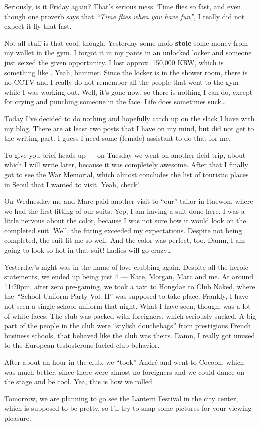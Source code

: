 \begin{post}
	\begin{content}
Seriously, is it Friday again? That's serious mess. Time flies so fast, and even though one proverb says that \textit{``Time flies when you have fun''}, I really did not expect it fly that fast.

Not all stuff is that cool, though. Yesterday some mofo \textbf{stole} some money from my wallet in the gym. I forgot it in my pants in an unlocked locker and someone just seized the given opportunity. I lost approx. 150,000 KRW, which is something like . Yeah, bummer. Since the locker is in the shower room, there is no CCTV and I really do not remember all the people that went to the gym while I was working out. Well, it's gone now, so there is nothing I can do, except for crying and punching someone in the face. Life does sometimes suck\ldots

Today I've decided to do nothing and hopefully catch up on the slack I have with my blog. There are at least two posts that I have on my mind, but did not get to the writing part. I guess I need some (female) assistant to do that for me.

To give you brief heads up --- on Tuesday we went on another field trip, about which I will write later, because it was completely awesome. After that I finally got to see the War Memorial, which almost concludes the list of touristic places in Seoul that I wanted to visit. Yeah, check!

On Wednesday me and Marc paid another visit to ``our'' tailor in Itaewon, where we had the first fitting of our suits. Yep, I am having a suit done here. I was a little nervous about the color, because I was not sure how it would look on the completed suit. Well, the fitting exceeded my expectations. Despite not being completed, the suit fit me so well. And the color was perfect, too. Damn, I am going to look so hot in that suit! Ladies will go crazy\ldots

Yesterday's night was in the name of \sout{love} clubbing again. Despite all the heroic statements, we ended up being just 4 --- Kate, Morgan, Marc and me. At around 11:20pm, after zero pre-gaming, we took a taxi to Hongdae to Club Naked, where the ``School Uniform Party Vol. II'' was supposed to take place. Frankly, I have not seen a single school uniform that night. What I have seen, though, was a lot of white faces. The club was packed with foreigners, which seriously sucked. A big part of the people in the club were ``stylish douchebags'' from prestigious French business schools, that behaved like the club was theirs. Damn, I really got unused to the European testosterone fueled club behavior.

After about an hour in the club, we ``took'' André and went to Cocoon, which was much better, since there were almost no foreigners and we could dance on the stage and be cool. Yea, this is how we rolled.

Tomorrow, we are planning to go see the Lantern Festival in the city center, which is supposed to be pretty, so I'll try to snap some pictures for your viewing pleasure.
	\end{content}
\end{post}

